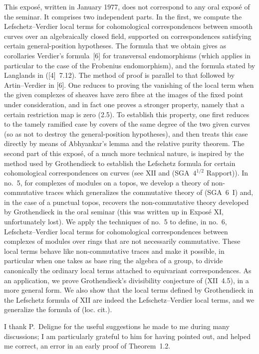 \documentclass[11pt]{article}
\begin{document}
This exposé, written in January 1977, does not correspond to any oral exposé of the seminar. It comprises two independent parts. In the first, we compute the Lefschetz--Verdier local terms for cohomological correspondences between smooth curves over an algebraically closed field, supported on correspondences satisfying certain general-position hypotheses. The formula that we obtain gives as corollaries Verdier's formula~[6] for transversal endomorphisms (which applies in particular to the case of the Frobenius endomorphism), and the formula stated by Langlands in ([4]~7.12). The method of proof is parallel to that followed by Artin--Verdier in [6]. One reduces to proving the vanishing of the local term when the given complexes of sheaves have zero fibre at the images of the fixed point under consideration, and in fact one proves a stronger property, namely that a certain restriction map is zero (2.5). To establish this property, one first reduces to the tamely ramified case by covers of the same degree of the two given curves (so as not to destroy the general-position hypotheses), and then treats this case directly by means of Abhyankar's lemma and the relative purity theorem. The second part of this exposé, of a much more technical nature, is inspired by the method used by Grothendieck to establish the Lefschetz formula for certain cohomological correspondences on curves (see XII and (SGA~$4^{1/2}$ Rapport)). In no.~5, for complexes of modules on a topos, we develop a theory of non-commutative traces which generalizes the commutative theory of (SGA~6~I) and, in the case of a punctual topos, recovers the non-commutative theory developed by Grothendieck in the oral seminar (this was written up in Exposé XI, unfortunately lost). We apply the techniques of no.~5 to define, in no.~6, Lefschetz--Verdier local terms for cohomological correspondences between complexes of modules over rings that are not necessarily commutative. These local terms behave like non-commutative traces and make it possible, in particular when one takes as base ring the algebra of a group, to divide canonically the ordinary local terms attached to equivariant correspondences. As an application, we prove Grothendieck's divisibility conjecture of (XII~4.5), in a more general form. We also show that the local terms defined by Grothendieck in the Lefschetz formula of XII are indeed the Lefschetz--Verdier local terms, and we generalize the formula of (loc. cit.).

I thank P.~Deligne for the useful suggestions he made to me during many discussions; I am particularly grateful to him for having pointed out, and helped me correct, an error in an early proof of Theorem~1.2.
\end{document}
